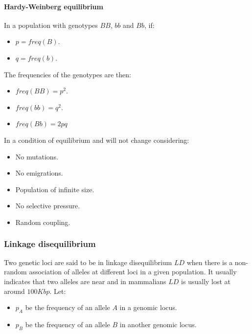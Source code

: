 			\paragraph{Hardy-Weinberg equilibrium}
			In a population with genotypes $BB$, $bb$ and $Bb$, if:

			\begin{multicols}{2}
				\begin{itemize}
					\item $p = freq(B)$.
					\item $q = freq(b)$.
				\end{itemize}
			\end{multicols}

			The frequencies of the genotypes are then:

			\begin{multicols}{3}
				\begin{itemize}
					\item $freq(BB) = p^2$.
					\item $freq(bb) = q^2$.
					\item $freq(Bb) = 2pq$
				\end{itemize}
			\end{multicols}

			In a condition of equilibrium and will not change considering:

			\begin{multicols}{3}
				\begin{itemize}
					\item No mutations.
					\item No emigrations.
					\item Population of infinite size.
					\item No selective pressure.
					\item Random coupling.
				\end{itemize}
			\end{multicols}

		\subsubsection{Linkage disequilibrium}
		Two genetic loci are said to be in linkage disequilibrium $LD$ when there is a non-random association of alleles at different loci in a given population.
		It usually indicates that two alleles are near and in mammalians $LD$ is usually lost at around $100Kbp$.
		Let:

		\begin{multicols}{2}
			\begin{itemize}
				\item $p_A$ be the frequency of an allele $A$ in a genomic locus.
				\item $p_B$ be the frequency of an allele $B$ in another genomic locus.
			\end{itemize}
		\end{multicols}

